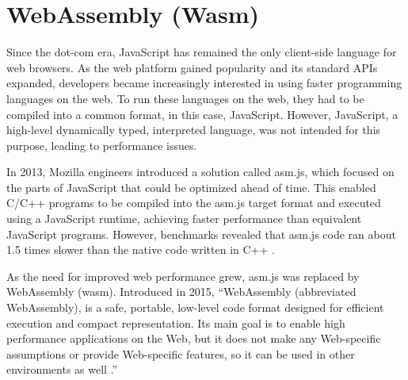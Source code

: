 \chapter{WebAssembly (Wasm)}
\label{chap:wasm}

Since the dot-com era, JavaScript has remained the only client-side language for web browsers. 
As the web platform gained popularity and its standard APIs expanded, developers became increasingly interested in using faster programming languages on the web. 
To run these languages on the web, they had to be compiled into a common format, in this case, JavaScript. However, JavaScript, a high-level dynamically typed, interpreted language, was not intended for this purpose, leading to performance issues.

In 2013, Mozilla engineers introduced a solution called asm.js, which focused on the parts of JavaScript that could be optimized ahead of time. This enabled C/C++ programs to be compiled into the asm.js target format and executed using a JavaScript runtime, 
achieving faster performance than equivalent JavaScript programs. However, benchmarks revealed that asm.js code ran about 1.5 times slower than the native code written in C++ \cite{zakai_2013_gap}.

As the need for improved web performance grew, asm.js was replaced by WebAssembly (wasm). Introduced in 2015, “WebAssembly (abbreviated \Gls{WebAssembly}), is a safe, portable, low-level code format designed for efficient execution and compact representation. 
Its main goal is to enable high performance applications on the Web, but it does not make any Web-specific assumptions or provide Web-specific features, so it can be used in other environments as well \cite[p. 1]{webassemblycommunitygroup_2023_webassembly}.”